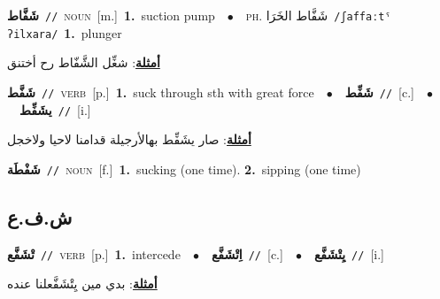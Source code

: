 \documentclass[10pt,a4paper,twoside]{article} %
\begin{document}
\begin{multicols}{2}
{\setlength\topsep{0pt}\textbf{\foreignlanguage{arabic}{شَفَّاط}}\ {\color{gray}\texttt{//}\color{black}}\ \textsc{noun}\ [m.]\ \textbf{1.}~suction pump\ \ $\bullet$\ \ \textsc{ph.} \color{gray} \foreignlanguage{arabic}{شَفَّاط الخَرَا}\color{black}\ {\color{gray}\texttt{/{\sffamily ʃaffaːtˤ ʔilxara}/}\color{black}}\ \textbf{1.}~plunger\  \begin{flushright}\color{gray}\foreignlanguage{arabic}{\textbf{\underline{\foreignlanguage{arabic}{أمثلة}}}: شغِّل الشَّفّاط رح أختنق}\end{flushright}\color{black}} \vspace{2mm}

{\setlength\topsep{0pt}\textbf{\foreignlanguage{arabic}{شَفَّط}}\ {\color{gray}\texttt{//}\color{black}}\ \textsc{verb}\ [p.]\ \textbf{1.}~suck through sth with great force\ \ $\bullet$\ \ \setlength\topsep{0pt}\textbf{\foreignlanguage{arabic}{شَفِّط}}\ {\color{gray}\texttt{//}\color{black}}\ [c.]\ \ $\bullet$\ \ \setlength\topsep{0pt}\textbf{\foreignlanguage{arabic}{يشَفِّط}}\ {\color{gray}\texttt{//}\color{black}}\ [i.]\  \begin{flushright}\color{gray}\foreignlanguage{arabic}{\textbf{\underline{\foreignlanguage{arabic}{أمثلة}}}: صار يشَفِّط بهالأرجيلة قدامنا لاحيا ولاخجل}\end{flushright}\color{black}} \vspace{2mm}

{\setlength\topsep{0pt}\textbf{\foreignlanguage{arabic}{شَفْطَة}}\ {\color{gray}\texttt{//}\color{black}}\ \textsc{noun}\ [f.]\ \textbf{1.}~sucking (one time).  \textbf{2.}~sipping (one time)\ } \vspace{2mm}

\vspace{-3mm}
\subsection*{\color{blue}\foreignlanguage{arabic}{ش.ف.ع}\color{blue}{}} 

{\setlength\topsep{0pt}\textbf{\foreignlanguage{arabic}{تْشَفَّع}}\ {\color{gray}\texttt{//}\color{black}}\ \textsc{verb}\ [p.]\ \textbf{1.}~intercede\ \ $\bullet$\ \ \setlength\topsep{0pt}\textbf{\foreignlanguage{arabic}{اِتْشَفَّع}}\ {\color{gray}\texttt{//}\color{black}}\ [c.]\ \ $\bullet$\ \ \setlength\topsep{0pt}\textbf{\foreignlanguage{arabic}{يِتْشَفَّع}}\ {\color{gray}\texttt{//}\color{black}}\ [i.]\  \begin{flushright}\color{gray}\foreignlanguage{arabic}{\textbf{\underline{\foreignlanguage{arabic}{أمثلة}}}: بدي مين يِتْشَفَّعلنا عنده}\end{flushright}\color{black}} \vspace{2mm}


\end{multicols}
\end{document}
